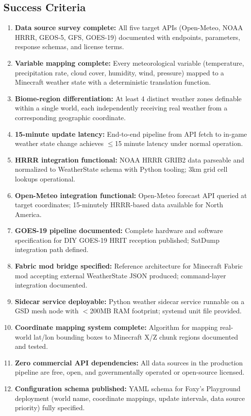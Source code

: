 \documentclass[11pt,letterpaper]{article}
\begin{document}
\subsection{Success Criteria}

\begin{enumerate}
  \item \textbf{Data source survey complete:} All five target APIs (Open-Meteo, NOAA HRRR, GEOS-5, GFS, GOES-19) documented with endpoints, parameters, response schemas, and license terms.
  \item \textbf{Variable mapping complete:} Every meteorological variable (temperature, precipitation rate, cloud cover, humidity, wind, pressure) mapped to a Minecraft weather state with a deterministic translation function.
  \item \textbf{Biome-region differentiation:} At least 4 distinct weather zones definable within a single world, each independently receiving real weather from a corresponding geographic coordinate.
  \item \textbf{15-minute update latency:} End-to-end pipeline from API fetch to in-game weather state change achieves $\leq$15 minute latency under normal operation.
  \item \textbf{HRRR integration functional:} NOAA HRRR GRIB2 data parseable and normalized to WeatherState schema with Python tooling; 3km grid cell lookups operational.
  \item \textbf{Open-Meteo integration functional:} Open-Meteo forecast API queried at target coordinates; 15-minutely HRRR-based data available for North America.
  \item \textbf{GOES-19 pipeline documented:} Complete hardware and software specification for DIY GOES-19 HRIT reception published; SatDump integration path defined.
  \item \textbf{Fabric mod bridge specified:} Reference architecture for Minecraft Fabric mod accepting external WeatherState JSON produced; command-layer integration documented.
  \item \textbf{Sidecar service deployable:} Python weather sidecar service runnable on a GSD mesh node with $<$200MB RAM footprint; systemd unit file provided.
  \item \textbf{Coordinate mapping system complete:} Algorithm for mapping real-world lat/lon bounding boxes to Minecraft X/Z chunk regions documented and tested.
  \item \textbf{Zero commercial API dependencies:} All data sources in the production pipeline are free, open, and governmentally operated or open-source licensed.
  \item \textbf{Configuration schema published:} YAML schema for Foxy's Playground deployment (world name, coordinate mappings, update intervals, data source priority) fully specified.
\end{enumerate}
\end{document}
